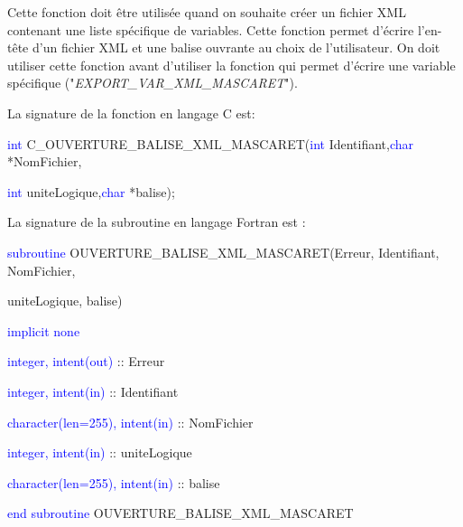 \documentclass[a4paper,11pt]{article}
\begin{document}
 Cette fonction doit \^etre utilis\'ee quand on souhaite cr\'eer un fichier XML contenant une liste sp\'ecifique de variables. Cette fonction permet d'\'ecrire l'en-t\^ete d'un fichier XML et une balise ouvrante au choix de l'utilisateur. On doit utiliser cette fonction avant d'utiliser la fonction qui permet d'\'ecrire une variable sp\'ecifique ("\textit{EXPORT\_VAR\_XML\_MASCARET}").
 
 \vspace{0.5cm}
 
 La signature de la fonction en langage C est:
 
 \vspace{0.5cm}
 
 \textcolor{blue}{int} C\_OUVERTURE\_BALISE\_XML\_MASCARET(\textcolor{blue}{int} Identifiant,\textcolor{blue}{char} *NomFichier,
 
 \textcolor{blue}{int} uniteLogique,\textcolor{blue}{char} *balise);
 
 \vspace{0.5cm}
 
 La signature de la subroutine en langage Fortran est :
 
 \vspace{0.5cm}
 
    \textcolor{blue}{subroutine} OUVERTURE\_BALISE\_XML\_MASCARET(Erreur, Identifiant, NomFichier,
    
     uniteLogique, balise)
    
        \hspace{1cm}\textcolor{blue}{implicit none}                 
        
        \hspace{1cm} \textcolor{blue}{integer, intent(out)} :: Erreur
        
        \hspace{1cm} \textcolor{blue}{integer, intent(in)} :: Identifiant
        
        \hspace{1cm} \textcolor{blue}{character(len=255), intent(in)} :: NomFichier
        
        \hspace{1cm} \textcolor{blue}{integer, intent(in)} :: uniteLogique
        
        \hspace{1cm} \textcolor{blue}{character(len=255), intent(in)} :: balise
        
    \textcolor{blue}{end subroutine} OUVERTURE\_BALISE\_XML\_MASCARET
    
\end{document}
